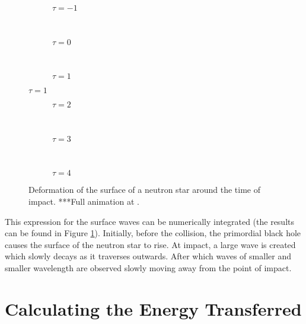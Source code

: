 \begin{figure}[p]
\begin{centering}
 \begin{subfigure}{\textwidth}
  
  \caption{$\tau = -1$}
 \end{subfigure} \\
 \begin{subfigure}{\textwidth}
  
  \caption{$\tau = 0$}
 \end{subfigure} \\
 \begin{subfigure}{\textwidth}
  
  \caption{$\tau = 1$}
 \end{subfigure}
\end{centering}
\end{figure}

\begin{figure}[p] \ContinuedFloat
\begin{centering}
 \begin{subfigure}{\textwidth}
  
  \caption{$\tau = 2$}
 \end{subfigure} \\
 \begin{subfigure}{\textwidth}
  
  \caption{$\tau = 3$}
 \end{subfigure} \\
  \begin{subfigure}{\textwidth}
  
  \caption{$\tau = 4$}
 \end{subfigure}
 \end{centering}
 \caption[Analytic Deformation of the Neutron Star]{Deformation of the surface of a neutron star around the time of impact. ***Full animation at .}
 \label{fig:eta}
\end{figure}

This expression for the surface waves can be numerically integrated (the results can be found in Figure \ref{fig:eta}). Initially, before the collision, the primordial black hole causes the surface of the neutron star to rise. At impact, a large wave is created which slowly decays as it traverses outwards. After which waves of smaller and smaller wavelength are observed slowly moving away from the point of impact.

\section{Calculating the Energy Transferred}
\label{chap:energy}

